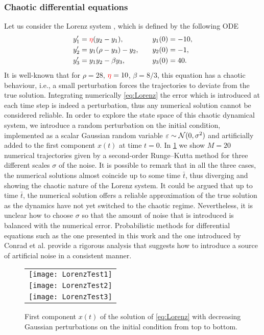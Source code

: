 \documentclass[10pt]{article}
\begin{document}
\subsubsection*{Chaotic differential equations} Let us consider the Lorenz system \cite{Lor63}, which is defined by the following ODE
\begin{equation}\label{eq:Lorenz}
\begin{aligned}
	y_1' &= {\color{red}\eta}(y_2 - y_1), \quad &&y_1(0) = -10,\\
	y_2' &= y_1(\rho - y_3) - y_2, \quad &&y_2(0) = -1,\\
	y_3' &= y_1y_2 - \beta y_3, \quad &&y_3(0) = 40.
\end{aligned}
\end{equation}
It is well-known that for $\rho=28$, ${\color{red}\eta}=10$, $\beta=8/3$, this equation has a chaotic behaviour, i.e., a small perturbation forces the trajectories to deviate from the true solution. Integrating numerically \eqref{eq:Lorenz} the error which is introduced at each time step is indeed a perturbation, thus any numerical solution cannot be considered reliable. In order to explore the state space of this chaotic dynamical system, we introduce a random perturbation on the initial condition, implemented as a scalar Gaussian random variable $\varepsilon \sim \mathcal{N}(0, \sigma^2)$ and artificially added to the first component $x(t)$ at time $t = 0$. In \cref{fig:LorenzTest} we show $M = 20$ numerical trajectories given by a second-order Runge--Kutta method for three different scales $\sigma$ of the noise. It is possible to remark that in all the three cases, the numerical solutions almost coincide up to some time $\bar t$, thus diverging and showing the chaotic nature of the Lorenz system. It could be argued that up to time $\bar t$, the numerical solution offers a reliable approximation of the true solution as the dynamics have not yet switched to the chaotic regime. Nevertheless, it is unclear how to choose $\sigma$ so that the amount of noise that is introduced is balanced with the numerical error. Probabilistic methods for differential equations such as the one presented in this work and the one introduced by Conrad et al. \cite{CGS17} provide a rigorous analysis that suggests how to introduce a source of artificial noise in a consistent manner.
 
\begin{figure}
	\begin{center}
		\begin{tabular}{c}
			\texttt{[image: LorenzTest1]} \\
			\texttt{[image: LorenzTest2]} \\
			\texttt{[image: LorenzTest3]}
		\end{tabular}
	\end{center}
	\caption{First component $x(t)$ of the solution of \eqref{eq:Lorenz} with decreasing Gaussian perturbations on the initial condition from top to bottom.}
	\label{fig:LorenzTest}
\end{figure}
\end{document}

